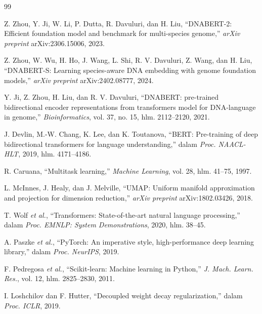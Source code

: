 \documentclass[conference]{IEEEtran}
\begin{document}
\begin{thebibliography}{99}

Z. Zhou, Y. Ji, W. Li, P. Dutta, R. Davuluri, dan H. Liu,
``DNABERT-2: Efficient foundation model and benchmark for multi-species
genome,'' \emph{arXiv preprint} arXiv:2306.15006, 2023.

Z. Zhou, W. Wu, H. Ho, J. Wang, L. Shi, R. V. Davuluri, Z. Wang, dan H. Liu,
``DNABERT-S: Learning species-aware DNA embedding with genome foundation
models,'' \emph{arXiv preprint} arXiv:2402.08777, 2024.

Y. Ji, Z. Zhou, H. Liu, dan R. V. Davuluri,
``DNABERT: pre-trained bidirectional encoder representations from
transformers model for DNA-language in genome,''
\emph{Bioinformatics}, vol. 37, no. 15, hlm. 2112--2120, 2021.

J. Devlin, M.-W. Chang, K. Lee, dan K. Toutanova,
``BERT: Pre-training of deep bidirectional transformers for language
understanding,'' dalam \emph{Proc. NAACL-HLT}, 2019, hlm. 4171--4186.

R. Caruana, ``Multitask learning,'' \emph{Machine Learning}, vol. 28,
hlm. 41--75, 1997.

L. McInnes, J. Healy, dan J. Melville,
``UMAP: Uniform manifold approximation and projection for dimension
reduction,'' \emph{arXiv preprint} arXiv:1802.03426, 2018.

T. Wolf \emph{et al.},
``Transformers: State-of-the-art natural language processing,'' dalam
\emph{Proc. EMNLP: System Demonstrations}, 2020, hlm. 38--45.

A. Paszke \emph{et al.},
``PyTorch: An imperative style, high-performance deep learning library,''
dalam \emph{Proc. NeurIPS}, 2019.

F. Pedregosa \emph{et al.},
``Scikit-learn: Machine learning in Python,''
\emph{J. Mach. Learn. Res.}, vol. 12, hlm. 2825--2830, 2011.

I. Loshchilov dan F. Hutter,
``Decoupled weight decay regularization,'' dalam \emph{Proc. ICLR}, 2019.

\end{thebibliography}
\end{document}
